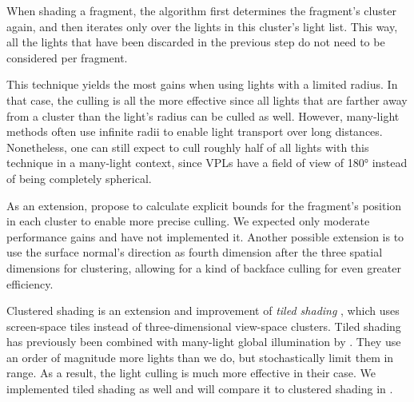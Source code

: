 When shading a fragment, the algorithm first determines the fragment's cluster again, and then iterates only over the lights in this cluster's light list. This way, all the lights that have been discarded in the previous step do not need to be considered per fragment.

This technique yields the most gains when using lights with a limited radius. In that case, the culling is all the more effective since all lights that are farther away from a cluster than the light's radius can be culled as well. However, many-light methods often use infinite radii to enable light transport over long distances. Nonetheless, one can still expect to cull roughly half of all lights with this technique in a many-light context, since VPLs have a field of view of 180° instead of being completely spherical.

As an extension, \citet{olsson2012clustered} propose to calculate explicit bounds for the fragment's position in each cluster to enable more precise culling. We expected only moderate performance gains and have not implemented it. Another possible extension is to use the surface normal's direction as fourth dimension after the three spatial dimensions for clustering, allowing for a kind of backface culling for even greater efficiency.


Clustered shading is an extension and improvement of \textit{tiled shading} \citep{Olsson:2011:TiledShading}, which uses screen-space tiles instead of three-dimensional view-space clusters. Tiled shading has previously been combined with many-light global illumination by \citet{Tokuyoshi:2016:Stochastic}. They use an order of magnitude more lights than we do, but stochastically limit them in range. As a result, the light culling is much more effective in their case.
We implemented tiled shading as well and will compare it to clustered shading in .
